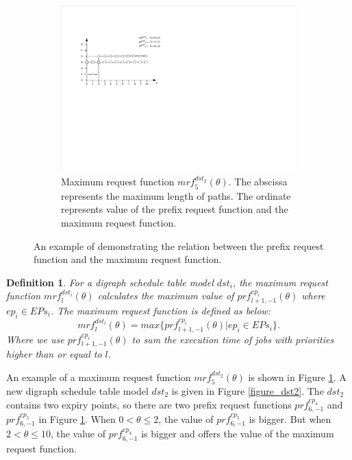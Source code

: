 \documentclass[10pt,conference]{IEEEtran}
\newtheorem{definition}{Definition}
\begin{document}
\begin{figure}
\begin{subfigure}[t]{3.25in}
    \centering
    \includegraphics[scale=.8]{graphics/figure_mrf.pdf}
    \caption{Maximum request function $mrf^{dst_2}_5(\theta)$. The abscissa represents the maximum length of paths. The ordinate represents value of the prefix request function and the maximum request function.}\label{figure_mrf}
  \end{subfigure}
  \caption{An example of demonstrating the relation between the prefix request function and the maximum request function.}\label{figure_dst2_mrf}
\end{figure}
\begin{definition}
For a digraph schedule table model $dst_i$, the maximum request function $mrf^{dst_i}_l(\theta)$ calculates the maximum value of $prf^{ep_i}_{l+1,-1}(\theta)$ where $ep_i\in EPs_i$. The maximum request function is defined as below:
\begin{equation}
mrf^{dst_i}_l(\theta)=max\{prf^{ep_i}_{l+1,-1}(\theta)|ep_i\in EPs_i\}.
\end{equation}\label{equation_mrf}
Where we use $prf^{ep_i}_{l+1,-1}(\theta)$ to sum the execution time of jobs with priorities higher than or equal to $l$.
\end{definition}

An example of a maximum request function $mrf^{dst_2}_5(\theta)$ is shown in Figure \ref{figure_mrf}. A new digraph schedule table model $dst_2$ is given in Figure \ref{figure_dst2}. The $dst_2$ contains two expiry points, so there are two prefix request functions $prf^{ep_4}_{6,-1}$ and $prf^{ep_5}_{6,-1}$ in Figure \ref{figure_mrf}. When $0<\theta\leq2$, the value of $prf^{ep_5}_{6,-1}$ is bigger. But when $2<\theta\leq10$, the value of $prf^{ep_4}_{6,-1}$ is bigger and offers the value of the maximum request function.%
\end{document}

